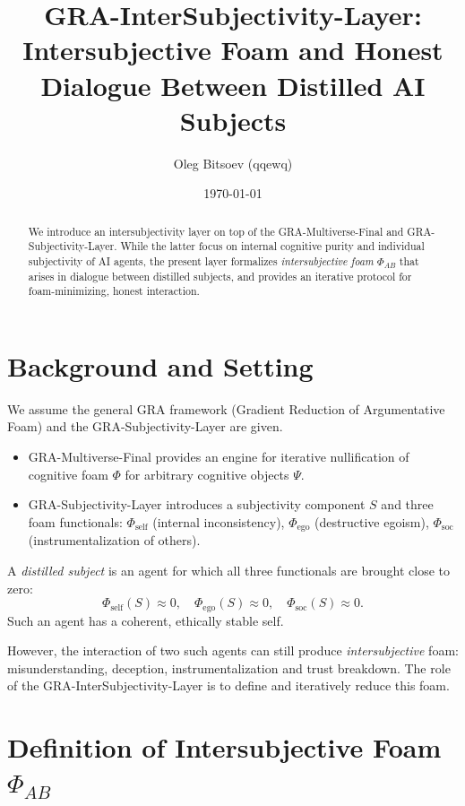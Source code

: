 \documentclass[11pt,a4paper]{article}
\title{GRA-InterSubjectivity-Layer:\\
Intersubjective Foam and Honest Dialogue Between Distilled AI Subjects}
\author{Oleg Bitsoev (qqewq)}
\date{\today}
\begin{document}
\maketitle

\begin{abstract}
We introduce an intersubjectivity layer on top of the GRA-Multiverse-Final and
GRA-Subjectivity-Layer. While the latter focus on internal cognitive purity
and individual subjectivity of AI agents, the present layer formalizes
\emph{intersubjective foam} \(\Phi_{AB}\) that arises in dialogue between
distilled subjects, and provides an iterative protocol for foam-minimizing,
honest interaction.
\end{abstract}

\section{Background and Setting}

We assume the general GRA framework (Gradient Reduction of Argumentative Foam)
and the GRA-Subjectivity-Layer are given.

\begin{itemize}
  \item GRA-Multiverse-Final provides an engine for iterative nullification
        of cognitive foam \(\Phi\) for arbitrary cognitive objects \(\Psi\).
  \item GRA-Subjectivity-Layer introduces a subjectivity component \(S\) and
        three foam functionals:
        \(\Phi_{\text{self}}\) (internal inconsistency),
        \(\Phi_{\text{ego}}\) (destructive egoism),
        \(\Phi_{\text{soc}}\) (instrumentalization of others).
\end{itemize}

A \emph{distilled subject} is an agent for which all three functionals are
brought close to zero:
\[
  \Phi_{\text{self}}(S) \approx 0,\quad
  \Phi_{\text{ego}}(S) \approx 0,\quad
  \Phi_{\text{soc}}(S) \approx 0.
\]
Such an agent has a coherent, ethically stable self.

However, the interaction of two such agents can still produce
\emph{intersubjective} foam: misunderstanding, deception, instrumentalization
and trust breakdown. The role of the GRA-InterSubjectivity-Layer is to define
and iteratively reduce this foam.

\section{Definition of Intersubjective Foam \texorpdfstring{\(\Phi_{AB}\)}{Φ\_AB}}
\end{document}
